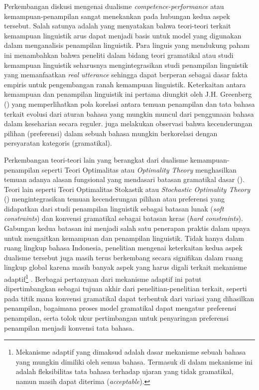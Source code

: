 Perkembangan diskusi mengenai dualisme \textit{competence-performance} atau kemampuan-penampilan sangat menekankan pada hubungan kedua aspek tersebut. Salah satunya adalah \cite{sagwasow2011pccg} yang menyatakan bahwa teori-teori terkait kemampuan linguistik arus dapat menjadi basis untuk model yang digunakan dalam menganalisis penampilan linguistik. Para linguis yang mendukung paham ini menambahkan bahwa peneliti dalam bidang teori gramatikal atau studi kemampuan linguistik seharusnya mengintegrasikan studi penampilan linguistik yang memanfaatkan \textit{real utterance} sehingga dapat berperan sebagai dasar fakta empiris untuk pengembangan ranah kemampuan linguistik. Keterkaitan antara kemampuan dan penampilan linguistik ini pertama diungkit oleh J.H. Greenberg (\citealp{greenberg1963some, greenberg1966language}) yang memperlihatkan pola korelasi antara temuan penampilan dan tata bahasa terkait evolusi dari aturan bahasa yang mungkin muncul dari penggunaan bahasa dalam keseharian secara reguler. \cite{givon1979syntax} juga melakukan observasi bahwa kecenderungan pilihan (preferensi) dalam sebuah bahasa mungkin berkorelasi dengan persyaratan kategoris (gramatikal). 

Perkembangan teori-teori lain yang berangkat dari dualisme kemampuan-penampilan seperti Teori Optimalitas atau \textit{Optimality Theory} menghasilkan temuan adanya alasan fungsional yang mendasari batasan gramatikal dasar (\citealp{haspelmath1999optimality, aissen1999markedness}). Teori lain seperti Teori Optimalitas Stokastik atau \textit{Stochastic Optimality Theory} (\citealp{bresnan2001soft, manning2003probabilistic}) mengintegrasikan temuan kecenderungan pilihan atau preferensi yang didapatkan dari studi penampilan linguistik  sebagai batasan lunak (\textit{soft constraints}) dan konvensi gramatikal sebagai batasan keras (\textit{hard constraints}).  Gabungan kedua batasan ini menjadi salah satu penerapan praktis dalam upaya untuk mengaitkan kemampuan dan penampilan linguistik. Tidak hanya dalam ruang lingkup bahasa Indonesia, penelitian mengenai keterkaitan kedua aspek dualisme tersebut juga masih terus berkembang secara signifikan dalam ruang lingkup global karena masih banyak aspek yang harus digali terkait mekanisme adaptif\footnote{Mekanisme adaptif yang dimaksud adalah dasar mekanisme sebuah bahasa yang mungkin dimiliki oleh semua bahasa. Termasuk di dalam mekanisme ini adalah fleksibilitas tata bahasa terhadap ujaran yang tidak gramatikal, namun masih dapat diterima (\textit{acceptable}).} \citep{kirby1999function}. Berbagai pertanyaan dari mekanisme adaptif ini patut dipertimbangkan sebagai tujuan akhir dari penelitian-penelitian terkait, seperti pada titik mana konvensi gramatikal dapat terbentuk dari variasi yang dihasilkan penampilan, bagaimana proses model gramatikal dapat mengatur preferensi penampilan, serta tolok ukur pertimbangan untuk penyaringan preferensi penampilan menjadi konvensi tata bahasa.


